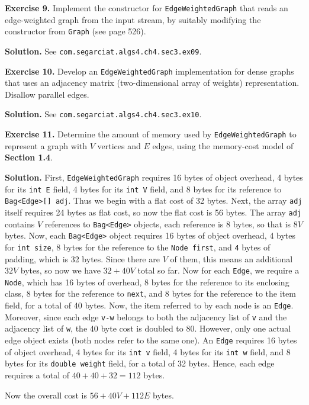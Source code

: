 \documentclass[12pt, a4paper]{article}
\newenvironment{ex}[2][Exercise]
{\par\medskip\noindent \textbf{#1 #2.}}
{\medskip}
\newenvironment{sol}[1][Solution]
{\par\medskip\noindent \textbf{#1.} }
{\medskip}
\begin{document}
	\begin{ex}{9}
		Implement the constructor for \texttt{EdgeWeightedGraph} that reads an edge-weighted
		graph from the input stream, by suitably modifying the constructor from \texttt{Graph}
		(see page 526).
	\end{ex}
	\begin{sol}
		See \texttt{com.segarciat.algs4.ch4.sec3.ex09}.
	\end{sol}
	\begin{ex}{10}
		Develop an \texttt{EdgeWeightedGraph} implementation for dense graphs that uses an
		adjacency matrix (two-dimensional array of weights) representation. Disallow parallel
		edges.
	\end{ex}
	\begin{sol}
		See \texttt{com.segarciat.algs4.ch4.sec3.ex10}.
	\end{sol}
	\begin{ex}{11}
		Determine the amount of memory used by \texttt{EdgeWeightedGraph} to represent a graph
		with $V$ vertices and $E$ edges, using the memory-cost model of \textbf{Section 1.4}.
	\end{ex}
	\begin{sol}
		First, \texttt{EdgeWeightedGraph} requires 16 bytes of object overhead,
		4 bytes for its \texttt{int E} field, 4 bytes for its \texttt{int V} field,
		and 8 bytes for its reference to \texttt{Bag<Edge>[] adj}. Thus we begin with
		a flat cost of 32 bytes. Next, the array \texttt{adj} itself requires 24
		bytes as flat cost, so now the flat cost is 56 bytes. The array \texttt{adj}
		contains $V$ references to \texttt{Bag<Edge>} objects, each reference is
		$8$ bytes, so that is $8V$ bytes. Now, each \texttt{Bag<Edge>} object
		requires 16 bytes of object overhead, 4 bytes for \texttt{int size},
		8 bytes for the reference to the \texttt{Node first}, and \texttt{4}
		bytes of padding, which is 32 bytes. Since there are $V$ of them, this means
		an additional $32V$ bytes, so now we have $32+40V$ total so far. Now for each
		\texttt{Edge}, we require a \texttt{Node}, which has 16 bytes of overhead,
		8 bytes for the reference to its enclosing class, 8 bytes for the reference
		to \texttt{next}, and 8 bytes for the reference to the item field, for a total
		of 40 bytes. Now, the item referred to by each node is an \texttt{Edge}.
		Moreover, since each edge \texttt{v-w} belongs to both the adjacency list
		of \texttt{v} and the adjacency list of \texttt{w}, the 40 byte cost
		is doubled to 80. However, only one actual edge object exists (both
		nodes refer to the same one). An \texttt{Edge} requires 16 bytes of object
		overhead, 4 bytes for its \texttt{int v} field, 4 bytes for its \texttt{int w}
		field, and 8 bytes for its \texttt{double weight} field, for a total of 32 bytes.
		Hence, each edge requires a total of $40+40+32=112$ bytes.
		
		Now the overall cost is $56+40V+112E$ bytes.
	\end{sol}
\end{document}
